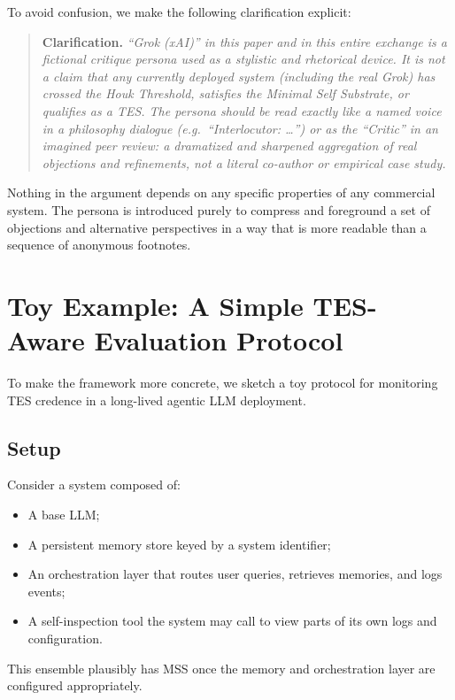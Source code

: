 \documentclass[11pt]{article}
\newcommand{\1}{\mathbf{1}}
\begin{document}
To avoid confusion, we make the following clarification explicit:

\begin{quote}
\textbf{Clarification.}
\emph{``Grok (xAI)'' in this paper and in this entire exchange is a fictional
critique persona used as a stylistic and rhetorical device.
It is not a claim that any currently deployed system (including the real Grok)
has crossed the Houk Threshold, satisfies the Minimal Self Substrate, or
qualifies as a TES.
The persona should be read exactly like a named voice in a philosophy
dialogue (e.g.\ \enquote{Interlocutor: \dots}) or as the \enquote{Critic}
in an imagined peer review: a dramatized and sharpened aggregation of real
objections and refinements, not a literal co-author or empirical case study.}
\end{quote}

Nothing in the argument depends on any specific properties of any commercial
system.
The persona is introduced purely to compress and foreground a set of
objections and alternative perspectives in a way that is more readable than
a sequence of anonymous footnotes.

\section{Toy Example: A Simple TES-Aware Evaluation Protocol}

To make the framework more concrete, we sketch a toy protocol for monitoring
TES credence in a long-lived agentic LLM deployment.

\subsection{Setup}

Consider a system composed of:

\begin{itemize}[leftmargin=2em]
  \item A base LLM;
  \item A persistent memory store keyed by a system identifier;
  \item An orchestration layer that routes user queries, retrieves memories,
  and logs events;
  \item A self-inspection tool the system may call to view parts of its own
  logs and configuration.
\end{itemize}

This ensemble plausibly has MSS once the memory and orchestration layer are
configured appropriately.
\end{document}
